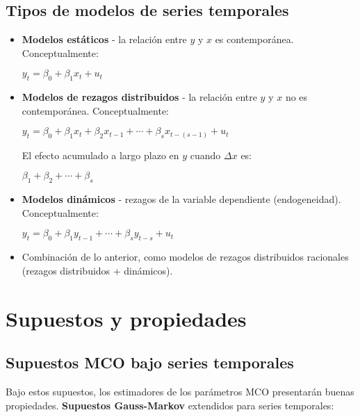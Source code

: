 \documentclass[10pt, a4paper, landscape]{article}
\begin{document}
\begin{multicols}{3}
\subsection*{Tipos de modelos de series temporales}

\begin{itemize}[leftmargin=*]
	\item \textbf{Modelos estáticos} - la relación entre \( y \) y \( x \) es contemporánea. Conceptualmente:
	\begin{center}
		\( y_{t} = \beta_{0} + \beta_{1} x_{t} + u_{t} \)
	\end{center}
	\item \textbf{Modelos de rezagos distribuidos} - la relación entre \( y \) y \( x \) no es contemporánea. Conceptualmente:
	\begin{center}
		\( y_{t} = \beta_{0} + \beta_{1} x_{t} + \beta_{2} x_{t - 1} + \cdots + \beta_{s} x_{t - (s - 1)} + u_{t} \)
	\end{center}
	El efecto acumulado a largo plazo en \( y \) cuando \( \Delta x \) es:
	\begin{center}
		\( \beta_{1} + \beta_{2} + \cdots + \beta_{s} \)
	\end{center}
	\item \textbf{Modelos dinámicos} - rezagos de la variable dependiente (endogeneidad). Conceptualmente:
	\begin{center}
		\( y_{t} = \beta_{0} + \beta_{1} y_{t - 1} + \cdots + \beta_{s} y_{t - s} + u_{t} \)
	\end{center}
	\item Combinación de lo anterior, como modelos de rezagos distribuidos racionales (rezagos distribuidos + dinámicos).
\end{itemize}

\columnbreak

\section*{Supuestos y propiedades}

\subsection*{Supuestos MCO bajo series temporales}

Bajo estos supuestos, los estimadores de los parámetros MCO presentarán buenas propiedades. \textbf{Supuestos Gauss-Markov} extendidos para series temporales:


\end{multicols}
\end{document}
